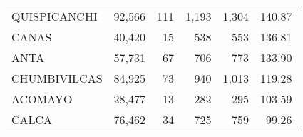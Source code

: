 \begin{tabular}{lrrrrr}
	\cellcolor[HTML]{FFFFC7}QUISPICANCHI                                               & 92,566                                                         & 111                                                      & 1,193                                                    & 1,304                                                               & 140.87                                                                       \\
	\cellcolor[HTML]{FFFFC7}CANAS                                                      & 40,420                                                         & 15                                                       & 538                                                      & 553                                                                 & 136.81                                                                       \\
	\cellcolor[HTML]{FFFFC7}ANTA                                                       & 57,731                                                         & 67                                                       & 706                                                      & 773                                                                 & 133.90                                                                       \\
	\cellcolor[HTML]{9AFF99}CHUMBIVILCAS                                               & 84,925                                                         & 73                                                       & 940                                                      & 1,013                                                               & 119.28                                                                       \\
	\cellcolor[HTML]{9AFF99}ACOMAYO                                                    & 28,477                                                         & 13                                                       & 282                                                      & 295                                                                 & 103.59                                                                       \\
	\cellcolor[HTML]{9AFF99}CALCA                                                      & 76,462                                                         & 34                                                       & 725                                                      & 759                                                                 & 99.26                                                                        \\

\end{tabular}
